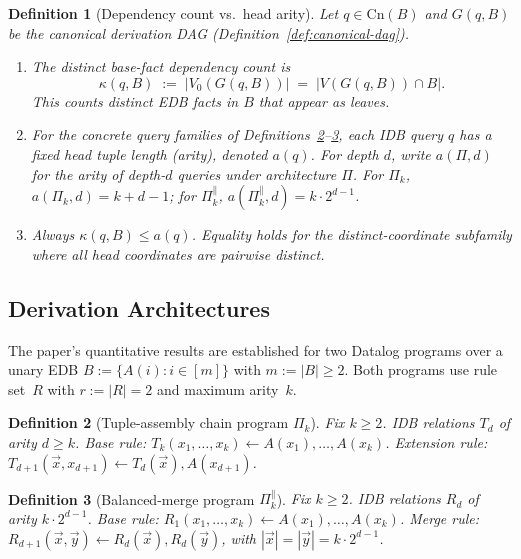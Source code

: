 \documentclass[journal]{IEEEtran}
\newcommand{\Cn}{\text{Cn}}
\newtheorem{definition}{Definition}[section]
\numberwithin{equation}{section}
\begin{document}
\begin{definition}[Dependency count vs.\ head arity]
\label{def:dep-count}
Let \(q\in\Cn(B)\) and \(G(q,B)\) be the canonical derivation DAG
(Definition~\ref{def:canonical-dag}).
\begin{enumerate}[label=\textup{(\roman*)}]
\item The \emph{distinct base-fact dependency count} is
\[
  \kappa(q,B)\;:=\;|V_0(G(q,B))|\;=\;|V(G(q,B))\cap B|.
\]
This counts \emph{distinct} EDB facts in \(B\) that appear as leaves.

\item For the concrete query families of
Definitions~\ref{def:tuple-assembly}--\ref{def:balanced-merge},
each IDB query \(q\) has a fixed head tuple length (arity), denoted \(a(q)\).
For depth \(d\), write \(a(\Pi,d)\) for the arity of depth-\(d\) queries under
architecture \(\Pi\).
For \(\Pi_k\), \(a(\Pi_k,d)=k+d-1\); for \(\Pi_k^{\parallel}\),
\(a(\Pi_k^{\parallel},d)=k\cdot 2^{d-1}\).

\item Always \(\kappa(q,B)\le a(q)\). Equality holds for the
\emph{distinct-coordinate} subfamily where all head coordinates are pairwise
distinct.
\end{enumerate}
\end{definition}

\subsection{Derivation Architectures}
\label{subsec:architectures}

The paper's quantitative results are established for two
Datalog programs over a unary EDB $B:=\{A(i):i\in[m]\}$
with $m:=|B|\ge 2$.
Both programs use rule set~$R$ with $r:=|R|=2$ and maximum
arity~$k$.

\begin{definition}[Tuple-assembly chain program $\Pi_k$]
\label{def:tuple-assembly}
Fix $k\ge 2$.
IDB relations $T_d$ of arity $d\ge k$.
\emph{Base rule:}
$T_k(x_1,\ldots,x_k)\leftarrow A(x_1),\ldots,A(x_k)$.
\emph{Extension rule:}
$T_{d+1}(\vec x,x_{d+1})\leftarrow T_d(\vec x),A(x_{d+1})$.
\end{definition}

\begin{definition}[Balanced-merge program $\Pi_k^{\parallel}$]
\label{def:balanced-merge}
Fix $k\ge 2$.
IDB relations $R_d$ of arity $k\cdot 2^{d-1}$.
\emph{Base rule:}
$R_1(x_1,\ldots,x_k)\leftarrow A(x_1),\ldots,A(x_k)$.
\emph{Merge rule:}
$R_{d+1}(\vec x,\vec y)\leftarrow R_d(\vec x),R_d(\vec y)$,
with $|\vec x|=|\vec y|=k\cdot 2^{d-1}$.
\end{definition}
\end{document}
